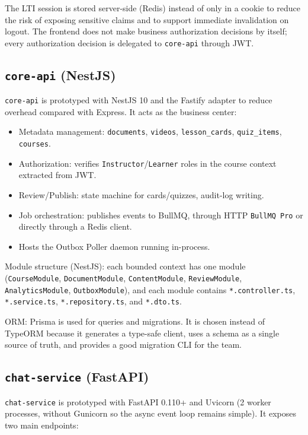 The LTI session is stored server-side (Redis) instead of only in a
cookie to reduce the risk of exposing sensitive claims and to support
immediate invalidation on logout. The frontend does not make business
authorization decisions by itself; every authorization decision is
delegated to \texttt{core-api} through JWT.

\subsection{\texttt{core-api} (NestJS)}

\texttt{core-api} is prototyped with NestJS 10 and the Fastify adapter
to reduce overhead compared with Express. It acts as the business center:

\begin{itemize}
    \item Metadata management: \texttt{documents}, \texttt{videos},
          \texttt{lesson\_cards}, \texttt{quiz\_items}, \texttt{courses}.
    \item Authorization: verifies \texttt{Instructor}/\texttt{Learner}
          roles in the course context extracted from JWT.
    \item Review/Publish: state machine for cards/quizzes, audit-log
          writing.
    \item Job orchestration: publishes events to BullMQ, through HTTP
          \texttt{BullMQ Pro} or directly through a Redis client.
    \item Hosts the Outbox Poller daemon running in-process.
\end{itemize}

Module structure (NestJS): each bounded context has one module
(\texttt{CourseModule}, \texttt{DocumentModule}, \texttt{ContentModule},
\texttt{ReviewModule}, \texttt{AnalyticsModule}, \texttt{OutboxModule}),
and each module contains \texttt{*.controller.ts}, \texttt{*.service.ts},
\texttt{*.repository.ts}, and \texttt{*.dto.ts}.

ORM: Prisma is used for queries and migrations. It is chosen instead of
TypeORM because it generates a type-safe client, uses a schema as a
single source of truth, and provides a good migration CLI for the team.

\subsection{\texttt{chat-service} (FastAPI)}

\texttt{chat-service} is prototyped with FastAPI 0.110+ and Uvicorn
(2 worker processes, without Gunicorn so the async event loop remains
simple). It exposes two main endpoints:

